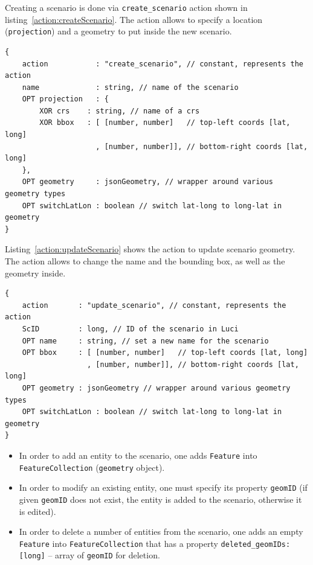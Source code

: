 Creating a scenario is done
via \texttt{create\_scenario} action shown in listing~\ref{action:createScenario}.
The action allows to specify a location (\texttt{projection}) and a geometry to put inside the new scenario.
\begin{lstlisting}[caption={JSON action structure for creating a scenario in \ac{Luci}}, label={action:createScenario}]
{
	action           : "create_scenario", // constant, represents the action
	name             : string, // name of the scenario
	OPT projection   : {
		XOR crs    : string, // name of a crs
		XOR bbox   : [ [number, number]   // top-left coords [lat, long]
		             , [number, number]], // bottom-right coords [lat, long]
	},
	OPT geometry     : jsonGeometry, // wrapper around various geometry types
	OPT switchLatLon : boolean // switch lat-long to long-lat in geometry
}
\end{lstlisting}


Listing~\ref{action:updateScenario} shows the action to update scenario geometry.
The action allows to change the name and the bounding box, as well as the geometry inside.
\begin{lstlisting}[caption={JSON action structure for updating a scenario in \ac{Luci}}, label={action:updateScenario}]
{
	action       : "update_scenario", // constant, represents the action
	ScID         : long, // ID of the scenario in Luci
	OPT name     : string, // set a new name for the scenario
	OPT bbox     : [ [number, number]   // top-left coords [lat, long]
	               , [number, number]], // bottom-right coords [lat, long]
	OPT geometry : jsonGeometry // wrapper around various geometry types
	OPT switchLatLon : boolean // switch lat-long to long-lat in geometry
}
\end{lstlisting}
\begin{itemize}
\item In order to add an entity to the scenario, one adds \texttt{Feature} into \texttt{FeatureCollection} (\texttt{geometry} object).
\item In order to modify an existing entity, one must specify its property \texttt{geomID} (if given \texttt{geomID} does not exist, the entity is added to the scenario, otherwise it is edited).
\item In order to delete a number of entities from the scenario, one adds an empty \texttt{Feature} into \texttt{FeatureCollection} that has a property \texttt{deleted\_geomIDs:[\color{blue}long\color{black}]} -- array of \texttt{geomID} for deletion.
\end{itemize}

